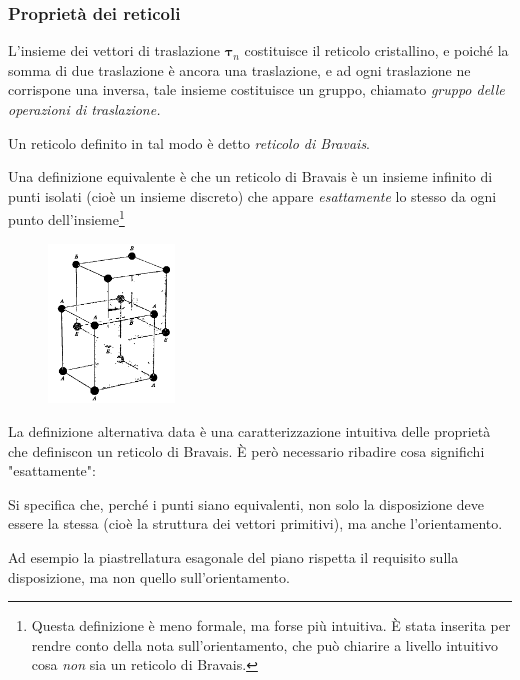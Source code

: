 \subsubsection{Proprietà dei reticoli}

L'insieme dei vettori di traslazione $ \bm{\tau}_n $ costituisce il reticolo cristallino, e poiché la somma di due traslazione è ancora una traslazione, e ad ogni traslazione ne corrispone una inversa, tale insieme costituisce un gruppo, chiamato \textit{gruppo delle operazioni di traslazione.}

Un reticolo definito in tal modo è detto \textit{reticolo di Bravais}.
\newline

Una definizione equivalente è che un reticolo di Bravais è un insieme infinito di punti isolati (cioè un insieme discreto) che appare \textit{esattamente} lo stesso da ogni punto dell'insieme\footnote{Questa definizione è meno formale, ma forse più intuitiva. \`E stata inserita per rendre conto della nota sull'orientamento, che può chiarire a livello intuitivo cosa \textit{non} sia un reticolo di Bravais.}

\begin{figure}
\vspace{-25pt}
\centering
\includegraphics[width=0.3\textwidth]{Immagini/BodyCenteredCubic.png}
\caption{}
\label{fig:bcc}
\vspace{-30pt}
\end{figure}

La definizione alternativa data è una caratterizzazione intuitiva delle proprietà che definiscon un reticolo di Bravais. \`E però necessario ribadire cosa significhi "esattamente":

\begin{note}[Orientamento]
	Si specifica che, perché i punti siano equivalenti, non solo la disposizione deve essere la stessa (cioè la struttura dei vettori primitivi), ma anche l'orientamento.
	
	Ad esempio la piastrellatura esagonale del piano rispetta il requisito sulla disposizione, ma non quello sull'orientamento.
\end{note}

